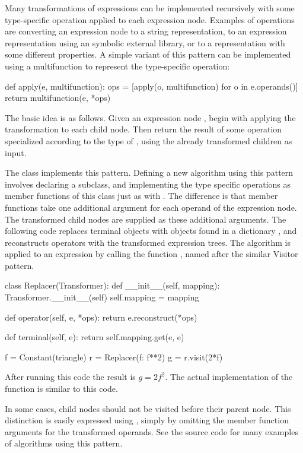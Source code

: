 Many transformations of expressions can be implemented recursively with
some type-specific operation applied to each expression node.  Examples of
operations are converting an expression node to a string representation,
to an expression representation using an symbolic external library, or
to a \ufl{} representation with some different properties.  A simple
variant of this pattern can be implemented using a multifunction to
represent the type-specific operation:
\begin{python}
def apply(e, multifunction):
    ops = [apply(o, multifunction) for o in e.operands()]
    return multifunction(e, *ops)
\end{python}
The basic idea is as follows. Given an expression node , begin
with applying the transformation to each child node.  Then return the
result of some operation specialized according to the type of ,
using the already transformed children as input.

The  class implements this pattern.  Defining a new
algorithm using this pattern involves declaring a 
subclass, and implementing the type specific operations as member
functions of this class just as with .  The difference
is that member functions take one additional argument for each operand
of the expression node. The transformed child nodes are supplied as these
additional arguments.  The following code replaces terminal objects with
objects found in a dictionary , and reconstructs operators
with the transformed expression trees. The algorithm is applied to an
expression by calling the function , named after the similar
Visitor pattern.
\begin{python}
class Replacer(Transformer):
    def __init__(self, mapping):
        Transformer.__init__(self)
        self.mapping = mapping

    def operator(self, e, *ops):
        return e.reconstruct(*ops)

    def terminal(self, e):
        return self.mapping.get(e, e)

f = Constant(triangle)
r = Replacer({f: f**2})
g = r.visit(2*f)
\end{python}
After running this code the result is $g = 2 f^2$.  The actual
implementation of the  function is similar to this code.

In some cases, child nodes should not be visited before their parent
node. This distinction is easily expressed using ,
simply by omitting the member function arguments for the transformed
operands. See the source code for many examples of algorithms using
this pattern.

